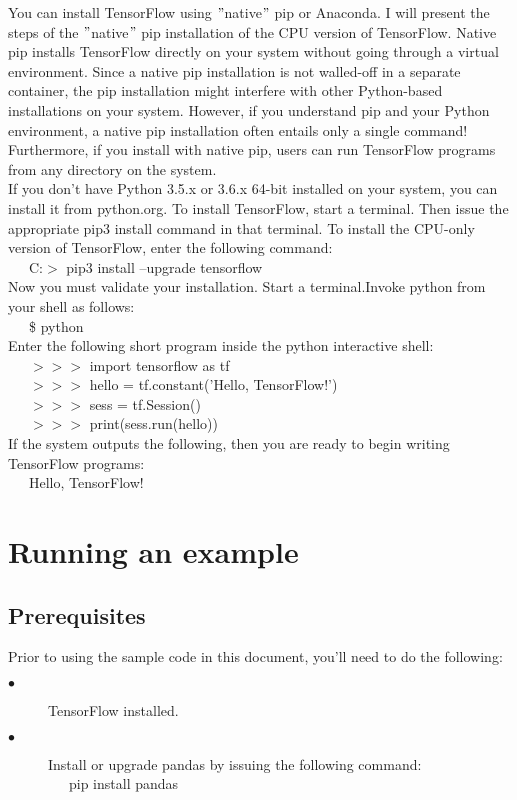 \documentclass[a4paper,10pt]{report}
\begin{document}
You can install TensorFlow using $"$native$"$ pip or Anaconda. I will present the steps of the $"$native$"$ pip installation of the CPU version of TensorFlow.
Native pip installs TensorFlow directly on your system without going through a virtual environment. Since a native pip installation is not walled-off in a separate container, 
the pip installation might interfere with other Python-based installations on your system. However, if you understand pip and your Python environment, 
a native pip installation often entails only a single command! Furthermore, if you install with native pip, users can run TensorFlow programs from any directory on the system.\\
If you don't have Python 3.5.x or 3.6.x 64-bit installed on your system, you can install it from python.org.
To install TensorFlow, start a terminal. Then issue the appropriate pip3 install command in that terminal. 
To install the CPU-only version of TensorFlow, enter the following command:\\
\-\ \-\ \-\ C:$>$ pip3 install --upgrade tensorflow\\
Now you must validate your installation. Start a terminal.Invoke python from your shell as follows:\\
\-\ \-\ \-\ \$ python\\
Enter the following short program inside the python interactive shell:\\
\-\ \-\ \-\ $>>>$ import tensorflow as tf\\
\-\ \-\ \-\ $>>>$ hello = tf.constant('Hello, TensorFlow!')\\
\-\ \-\ \-\ $>>>$ sess = tf.Session()\\
\-\ \-\ \-\ $>>>$ print(sess.run(hello))\\
If the system outputs the following, then you are ready to begin writing TensorFlow programs:\\

\-\ \-\ \-\ Hello, TensorFlow!\\


 \section{Running an example}
 \subsection{Prerequisites}
 Prior to using the sample code in this document, you'll need to do the following:\\
 \begin{description}
  \item [$\bullet$]TensorFlow installed.
  \item [$\bullet$]Install or upgrade pandas by issuing the following command:\\
  \-\ \-\ \-\ pip install pandas
 \end{description}
\end{document}

